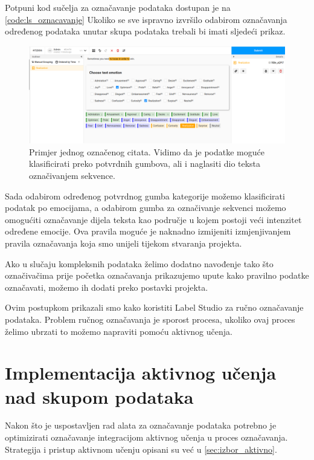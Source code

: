 \documentclass[times, utf8, zavrsni, numeric]{fer}
\begin{document}
Potpuni kod sučelja za označavanje podataka dostupan je na \autoref{code:ls_oznacavanje}
Ukoliko se sve ispravno izvršilo odabirom označavanja određenog podataka unutar skupa podataka trebali bi imati sljedeći prikaz.

\begin{figure}[H]
    \centering
    \includegraphics[width=\textwidth]{pictures/primjer_oznacavanja.png}
    \caption{Primjer jednog označenog citata. Vidimo da je podatke moguće klasificirati preko potvrdnih gumbova, ali i naglasiti dio teksta označivanjem sekvence.}
    \label{primjer_oznacavanja}
\end{figure}

Sada odabirom određenog potvrdnog gumba kategorije možemo klasificirati podatak po emocijama, a odabirom gumba za označivanje sekvenci možemo omogućiti označavanje dijela teksta kao područje u kojem postoji veći intenzitet određene emocije. Ova pravila moguće je naknadno izmijeniti izmjenjivanjem pravila označavanja koja smo unijeli tijekom stvaranja projekta.

Ako u slučaju kompleksnih podataka želimo dodatno navođenje tako što označivačima prije početka označavanja prikazujemo upute kako pravilno podatke označavati, možemo ih dodati preko postavki projekta.

Ovim postupkom prikazali smo kako koristiti Label Studio za ručno označavanje podataka. Problem ručnog označavanja je sporost procesa, ukoliko ovaj proces želimo ubrzati to možemo napraviti pomoću aktivnog učenja.

\section{Implementacija aktivnog učenja nad skupom podataka}

Nakon što je uspostavljen rad alata za označavanje podataka potrebno je optimizirati označavanje integracijom aktivnog učenja u proces označavanja. Strategija i pristup aktivnom učenju opisani su već u  \autoref{sec:izbor_aktivno}.
\end{document}
